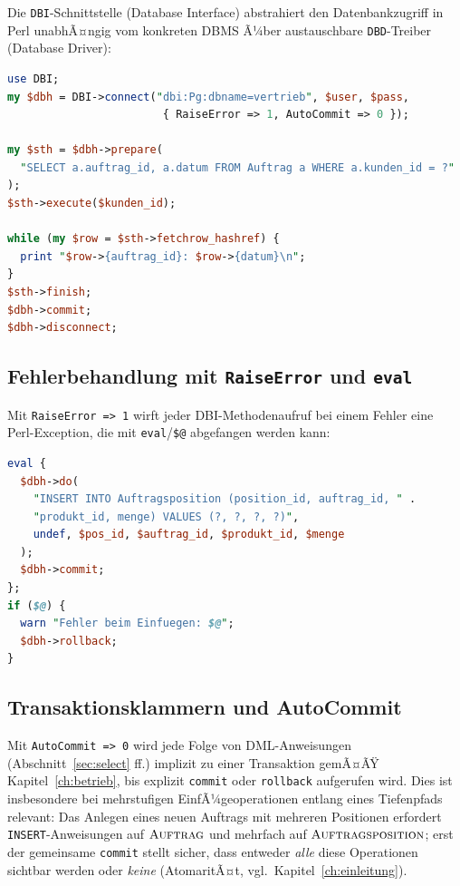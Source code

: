 ﻿\documentclass[a4paper,12pt]{report}
\theoremstyle{definition}
\theoremstyle{remark}
\begin{document}
Die \texttt{DBI}-Schnittstelle (Database Interface) abstrahiert den
Datenbankzugriff in Perl unabhÃ¤ngig vom konkreten DBMS Ã¼ber
austauschbare \texttt{DBD}-Treiber (Database Driver):

\begin{lstlisting}[language=Perl]
use DBI;
my $dbh = DBI->connect("dbi:Pg:dbname=vertrieb", $user, $pass,
                        { RaiseError => 1, AutoCommit => 0 });

my $sth = $dbh->prepare(
  "SELECT a.auftrag_id, a.datum FROM Auftrag a WHERE a.kunden_id = ?"
);
$sth->execute($kunden_id);

while (my $row = $sth->fetchrow_hashref) {
  print "$row->{auftrag_id}: $row->{datum}\n";
}
$sth->finish;
$dbh->commit;
$dbh->disconnect;
\end{lstlisting}

\subsection{Fehlerbehandlung mit \texttt{RaiseError} und \texttt{eval}}

Mit \texttt{RaiseError => 1} wirft jeder DBI-Methodenaufruf bei einem
Fehler eine Perl-Exception, die mit \texttt{eval}/\texttt{\$@}
abgefangen werden kann:

\begin{lstlisting}[language=Perl]
eval {
  $dbh->do(
    "INSERT INTO Auftragsposition (position_id, auftrag_id, " .
    "produkt_id, menge) VALUES (?, ?, ?, ?)",
    undef, $pos_id, $auftrag_id, $produkt_id, $menge
  );
  $dbh->commit;
};
if ($@) {
  warn "Fehler beim Einfuegen: $@";
  $dbh->rollback;
}
\end{lstlisting}

\subsection{Transaktionsklammern und AutoCommit}

Mit \texttt{AutoCommit => 0} wird jede Folge von DML-Anweisungen
(Abschnitt~\ref{sec:select} ff.) implizit zu einer Transaktion gemÃ¤ÃŸ
Kapitel~\ref{ch:betrieb}, bis explizit \texttt{commit} oder
\texttt{rollback} aufgerufen wird. Dies ist insbesondere bei
mehrstufigen EinfÃ¼geoperationen entlang eines Tiefenpfads relevant: Das
Anlegen eines neuen Auftrags mit mehreren Positionen erfordert
\texttt{INSERT}-Anweisungen auf $\textsc{Auftrag}$ und mehrfach auf
$\textsc{Auftragsposition}$; erst der gemeinsame
\texttt{commit} stellt sicher, dass entweder \emph{alle} diese
Operationen sichtbar werden oder \emph{keine} (AtomaritÃ¤t, vgl.\
Kapitel~\ref{ch:einleitung}).
\end{document}
